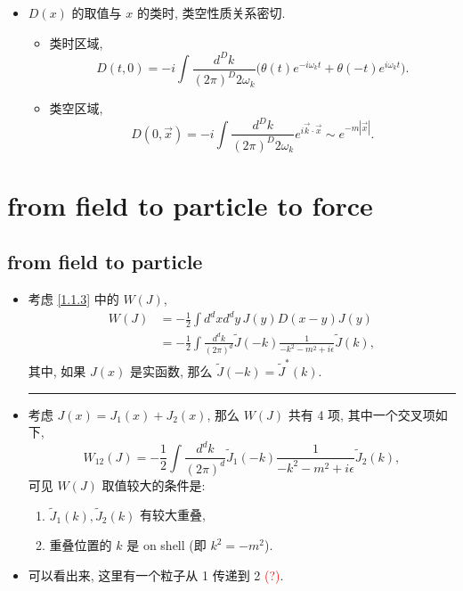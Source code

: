 \begin{itemize}
	\item $D(x)$ 的取值与 $x$ 的类时, 类空性质关系密切.
	\begin{itemize}
		\item 类时区域,
		\begin{equation}
			D(t, 0) = - i \int \frac{d^D k}{(2 \pi)^D 2 \omega_k} \Big( \theta(t) e^{- i \omega_k t} + \theta(- t) e^{i \omega_k t} \Big).
		\end{equation}
		
		\item 类空区域,
		\begin{equation}
			D(0, \vec{x}) = - i \int \frac{d^D k}{(2 \pi)^D 2 \omega_k} e^{i \vec{k} \cdot \vec{x}} \sim e^{- m |\vec{x}|}.
		\end{equation}
	\end{itemize}
\end{itemize}

\section{from field to particle to force}
\subsection{from field to particle}
\begin{itemize}
	\item 考虑 \eqref{1.1.3} 中的 $W(J)$,
	\begin{align}
		W(J) &= - \frac{1}{2} \int d^d x d^d y \, J(y) D(x - y) J(y) \\
		&= - \frac{1}{2} \int \frac{d^d k}{(2 \pi)^d} \tilde{J}(- k) \frac{1}{- k^2 - m^2 + i \epsilon} \tilde{J}(k),
	\end{align}
	其中, 如果 $J(x)$ 是实函数, 那么 $\tilde{J}(- k) = \tilde{J}^*(k)$.
	
	\noindent\rule[0.5ex]{\linewidth}{0.5pt} %
	
	\item 考虑 $J(x) = J_1(x) + J_2(x)$, 那么 $W(J)$ 共有 4 项, 其中一个交叉项如下,
	\begin{equation}
		W_{1 2}(J) = - \frac{1}{2} \int \frac{d^d k}{(2 \pi)^d} \tilde{J}_1(- k) \frac{1}{- k^2 - m^2 + i \epsilon} \tilde{J}_2(k),
	\end{equation}
	可见 $W(J)$ 取值较大的条件是:
	\begin{enumerate}
		\item $\tilde{J}_1(k), \tilde{J}_2(k)$ 有较大重叠,
		
		\item 重叠位置的 $k$ 是 on shell (即 $k^2 = - m^2$).
	\end{enumerate}
	
	\item 可以看出来, 这里有一个粒子从 1 传递到 2 \textcolor{red}{(?)}.
\end{itemize}

